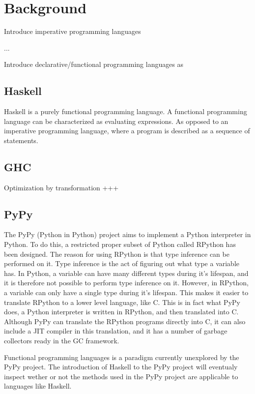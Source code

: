 
\chapter{Background}


Introduce imperative programming languages

...

Introduce declarative/functional programming languages as 



\section{Haskell}

Haskell is a purely functional programming language. A functional programming language
can be characterized as evaluating expressions. As opposed to an imperative 
programming language, where a program is described as a sequence of statements.


\section{GHC}

Optimization by transformation +++

\section{PyPy}

The PyPy (Python in Python) project aims to implement a Python interpreter in Python.
To do this, a restricted proper subset of Python called RPython has been designed.
The reason for using RPython is that type inference can be performed on it. Type
inference is the act of figuring out what type a variable has. In Python, a variable
can have many different types during it's lifespan, and it is therefore not possible
to perform type inference on it. However, in RPython, a variable can only have a 
single type during it's lifespan. This makes it easier to translate RPython to a lower
level language, like C. This is in fact what PyPy does, a Python interpreter is written
in RPython, and then translated into C. Although PyPy can translate the RPython programs
directly into C, it can also include a JIT compiler in this translation, and it has
a number of garbage collectors ready in the GC framework.



Functional programming languages is a paradigm currently
unexplored by the PyPy project. The introduction of Haskell
to the PyPy project will eventualy inspect wether or not 
the methods used in the PyPy project are applicable to languages
like Haskell.


